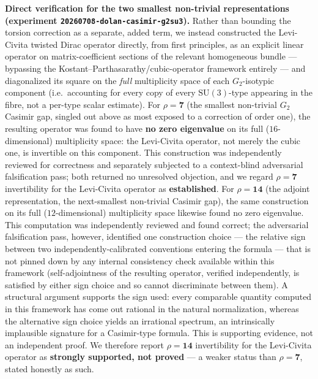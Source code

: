 \documentclass[12pt,a4paper]{article}
\begin{document}
\textbf{Direct verification for the two smallest non-trivial representations (experiment
\texttt{20260708-dolan-casimir-g2su3}).} Rather than bounding the torsion correction as a
separate, added term, we instead constructed the Levi-Civita twisted Dirac operator directly,
from first principles, as an explicit linear operator on matrix-coefficient sections of the
relevant homogeneous bundle --- bypassing the Kostant--Parthasarathy/cubic-operator framework
entirely --- and diagonalized its square on the \emph{full} multiplicity space of each
$G_2$-isotypic component (i.e.\ accounting for every copy of every $\mathrm{SU}(3)$-type
appearing in the fibre, not a per-type scalar estimate).
For $\rho=\mathbf{7}$ (the smallest non-trivial $G_2$ Casimir gap, singled out above as most
exposed to a correction of order one), the resulting operator was found to have \textbf{no zero
eigenvalue} on its full ($16$-dimensional) multiplicity space: the Levi-Civita operator, not
merely the cubic one, is invertible on this component. This construction was independently
reviewed for correctness and separately subjected to a context-blind adversarial falsification
pass; both returned no unresolved objection, and we regard $\rho=\mathbf{7}$ invertibility for
the Levi-Civita operator as \textbf{established}.
For $\rho=\mathbf{14}$ (the adjoint representation, the next-smallest non-trivial Casimir gap),
the same construction on its full ($12$-dimensional) multiplicity space likewise found no zero
eigenvalue. This computation was independently reviewed and found correct; the adversarial
falsification pass, however, identified one construction choice --- the relative sign between
two independently-calibrated conventions entering the formula --- that is not pinned down by any
internal consistency check available within this framework (self-adjointness of the resulting
operator, verified independently, is satisfied by either sign choice and so cannot discriminate
between them). A structural argument supports the sign used: every comparable quantity computed
in this framework has come out rational in the natural normalization, whereas the alternative
sign choice yields an irrational spectrum, an intrinsically implausible signature for a
Casimir-type formula. This is supporting evidence, not an independent proof. We therefore report
$\rho=\mathbf{14}$ invertibility for the Levi-Civita operator as \textbf{strongly supported, not
proved} --- a weaker status than $\rho=\mathbf{7}$, stated honestly as such.
\end{document}
